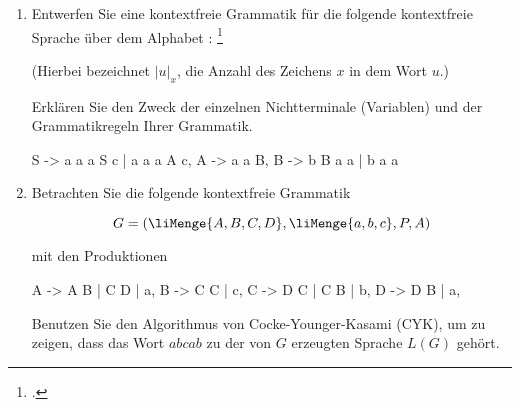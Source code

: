 \documentclass{bschlangaul-aufgabe}
\begin{document}

\let\m=\liMenge
\let\l=\liKurzeTabellenLinie

\begin{enumerate}


\item Entwerfen Sie eine kontextfreie Grammatik für die folgende
kontextfreie Sprache über dem Alphabet :
\footcite{examen:66115:2020:03}

\begin{center}
\end{center}

(Hierbei bezeichnet $|u|_x$, die Anzahl des Zeichens $x$ in dem Wort $u$.)

Erklären Sie den Zweck der einzelnen Nichtterminale (Variablen) und der
Grammatikregeln Ihrer Grammatik.

\begin{liAntwort}
\begin{liProduktionsRegeln}
S -> a a a S c | a a a A c,
A -> a a B,
B -> b B a a | b a a
\end{liProduktionsRegeln}
\end{liAntwort}


\item Betrachten Sie die folgende kontextfreie Grammatik

\begin{displaymath}
G=(\m{A,B,C,D}, \m{a,b,c}, P, A)
\end{displaymath}

mit den Produktionen

\begin{liProduktionsRegeln}
A -> A B | C D | a,
B -> C C | c,
C -> D C | C B | b,
D -> D B | a,
\end{liProduktionsRegeln}

Benutzen Sie den Algorithmus von Cocke-Younger-Kasami (CYK), um zu
zeigen, dass das Wort $abcab$ zu der von $G$ erzeugten Sprache $L(G)$
gehört.


\end{enumerate}
\end{document}
